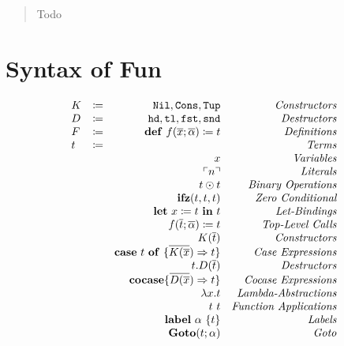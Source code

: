 \documentclass[nonacm]{acmart}
\newcommand{\lit}[1]{\ensuremath{\ulcorner #1\urcorner}}
\newcommand{\letin}[3]{\ensuremath{\mathbf{let}\ #1 \coloneq #2\ \mathbf{in}\ #3}}
\newcommand{\caseof}[2]{\ensuremath{\mathbf{case}\ #1\ \mathbf{of}\ \{ #2 \}}}
\begin{document}
\begin{abstract}
  Todo
\end{abstract}

\maketitle


\section{Syntax of Fun}

\[ 
\begin{array}{l c r r} 
  K & \coloneqq & \mathtt{Nil}, \mathtt{Cons}, \mathtt{Tup} & \emph{Constructors}\\
  D & \coloneqq & \mathtt{hd}, \mathtt{tl}, \mathtt{fst}, \mathtt{snd} & \emph{Destructors}\\
  F & \coloneqq & \mathbf{def}\ f(\overline{x};\overline{\alpha}) \coloneq t & \emph{Definitions}\\
  t & \coloneqq & & \emph{Terms}\\
  && x & \emph{Variables}\\
  && \lit{n}  & \emph{Literals}\\
  && t \odot t & \emph{Binary Operations}\\
  && \mathbf{ifz}(t,t,t) & \emph{Zero Conditional}\\
  && \letin{x}{t}{t} & \emph{Let-Bindings}\\
  && f(\overline{t};\overline{\alpha}) \coloneq t & \emph{Top-Level Calls}\\
  && K(\overline{t}) & \emph{Constructors}\\
  && \caseof{t}{\overline{K(\overline{x}}) \Rightarrow t} & \emph{Case Expressions}\\
  && t.D(\overline{t}) & \emph{Destructors}\\
  && \mathbf{cocase} \{ \overline{ D(\overline{x}}) \Rightarrow t \} & \emph{Cocase Expressions}\\
  && \lambda x.t & \emph{Lambda-Abstractions}\\
  && t\ t & \emph{Function Applications}\\
  && \mathbf{label}\ \alpha\ \{t\} & \emph{Labels}\\
  && \mathbf{Goto}(t;\alpha) & \emph{Goto}
\end{array}
\]
\end{document}
